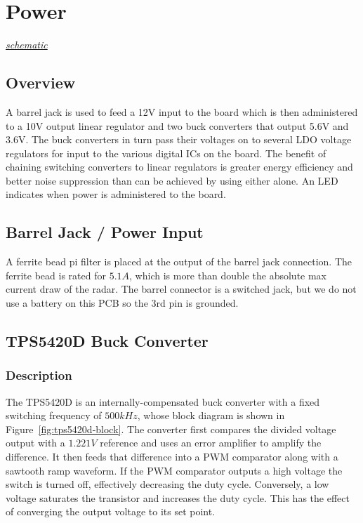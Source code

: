 \section{Power}
\label{sec:power}
\textit{\hyperlink{schematic.8}{schematic}}

\subsection{Overview}
\label{sec:power-overview}

A barrel jack is used to feed a 12V input to the board which is then administered to a 10V output
linear regulator and two buck converters that output 5.6V and 3.6V. The buck converters in turn pass
their voltages on to several LDO voltage regulators for input to the various digital ICs on the
board. The benefit of chaining switching converters to linear regulators is greater energy
efficiency and better noise suppression than can be achieved by using either alone. An LED indicates
when power is administered to the board.

\subsection{Barrel Jack / Power Input}
\label{sec:power-input}

A ferrite bead pi filter is placed at the output of the barrel jack connection. The ferrite bead is
rated for $5.1A$, which is more than double the absolute max current draw of the radar. The barrel
connector is a switched jack, but we do not use a battery on this PCB so the 3rd pin is grounded.

\subsection{TPS5420D Buck Converter}
\label{sec:tps5420d}

\subsubsection{Description}
\label{sec:tps5420d-description}

The TPS5420D is an internally-compensated buck converter with a fixed switching frequency of
$500\si{kHz}$, whose block diagram is shown in Figure~\ref{fig:tps5420d-block}. The converter first
compares the divided voltage output with a $1.221V$ reference and uses an error amplifier to amplify
the difference. It then feeds that difference into a PWM comparator along with a sawtooth ramp
waveform. If the PWM comparator outputs a high voltage the switch is turned off, effectively
decreasing the duty cycle. Conversely, a low voltage saturates the transistor and increases the duty
cycle. This has the effect of converging the output voltage to its set point.


